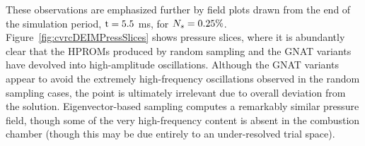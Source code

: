 These observations are emphasized further by field plots drawn from the end of the simulation period, $\text{t} = 5.5$ ms, for $N_s = 0.25\%$. Figure~\ref{fig:cvrcDEIMPressSlices} shows pressure slices, where it is abundantly clear that the HPROMs produced by random sampling and the GNAT variants have devolved into high-amplitude oscillations. Although the GNAT variants appear to avoid the extremely high-frequency oscillations observed in the random sampling cases, the point is ultimately irrelevant due to overall deviation from the solution. Eigenvector-based sampling computes a remarkably similar pressure field, though some of the very high-frequency content is absent in the combustion chamber (though this may be due entirely to an under-resolved trial space). 

\begin{figure}
	\begin{minipage}{0.99\linewidth}
	\end{minipage}
	\begin{minipage}{0.99\linewidth}

\end{minipage}
\end{figure}
